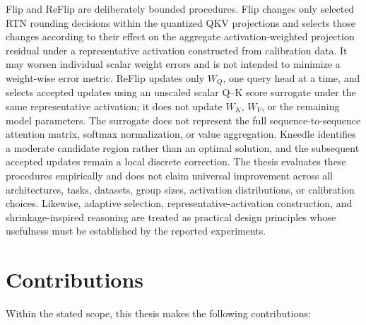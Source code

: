 Flip and ReFlip are deliberately bounded procedures. Flip changes only selected RTN rounding decisions within the quantized QKV projections and selects those changes according to their effect on the aggregate activation-weighted projection residual under a representative activation constructed from calibration data. It may worsen individual scalar weight errors and is not intended to minimize a weight-wise error metric. ReFlip updates only \(W_Q\), one query head at a time, and selects accepted updates using an unscaled scalar Q--K score surrogate under the same representative activation; it does not update \(W_K\), \(W_V\), or the remaining model parameters. The surrogate does not represent the full sequence-to-sequence attention matrix, softmax normalization, or value aggregation. Kneedle identifies a moderate candidate region rather than an optimal solution, and the subsequent accepted updates remain a local discrete correction. The thesis evaluates these procedures empirically and does not claim universal improvement across all architectures, tasks, datasets, group sizes, activation distributions, or calibration choices. Likewise, adaptive selection, representative-activation construction, and shrinkage-inspired reasoning are treated as practical design principles whose usefulness must be established by the reported experiments.

\section{Contributions}

Within the stated scope, this thesis makes the following contributions:

